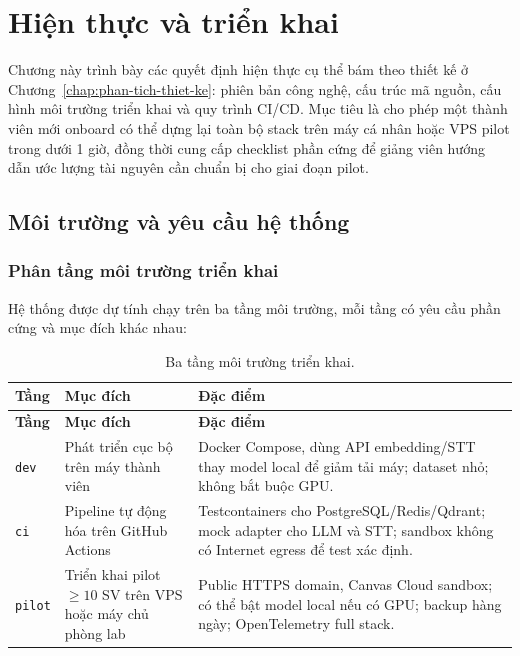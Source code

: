 \chapter{Hiện thực và triển khai}
\label{chap:hien-thuc-trien-khai}

Chương này trình bày các quyết định hiện thực cụ thể bám theo thiết kế
ở Chương~\ref{chap:phan-tich-thiet-ke}: phiên bản công nghệ, cấu trúc
mã nguồn, cấu hình môi trường triển khai và quy trình CI/CD. Mục tiêu
là cho phép một thành viên mới onboard có thể dựng lại toàn bộ stack
trên máy cá nhân hoặc VPS pilot trong dưới 1 giờ, đồng thời cung cấp
checklist phần cứng để giảng viên hướng dẫn ước lượng tài nguyên cần
chuẩn bị cho giai đoạn pilot.

\section{Môi trường và yêu cầu hệ thống}
\label{sec:environment-requirements}

\subsection{Phân tầng môi trường triển khai}

Hệ thống được dự tính chạy trên ba tầng môi trường, mỗi tầng có yêu
cầu phần cứng và mục đích khác nhau:

\begin{longtable}{|p{2cm}|p{3.2cm}|p{8.3cm}|}
\caption{Ba tầng môi trường triển khai.}
\label{tab:envs-c5} \\
\hline
\textbf{Tầng} & \textbf{Mục đích} & \textbf{Đặc điểm} \\
\hline
\endfirsthead
\hline
\textbf{Tầng} & \textbf{Mục đích} & \textbf{Đặc điểm} \\
\hline
\endhead

\texttt{dev}
    & Phát triển cục bộ trên máy thành viên
    & Docker Compose, dùng API embedding/STT thay model local để giảm
      tải máy; dataset nhỏ; không bắt buộc GPU. \\
\hline
\texttt{ci}
    & Pipeline tự động hóa trên GitHub Actions
    & Testcontainers cho PostgreSQL/Redis/Qdrant; mock adapter cho LLM
      và STT; sandbox không có Internet egress để test xác định. \\
\hline
\texttt{pilot}
    & Triển khai pilot $\geq 10$ SV trên VPS hoặc máy chủ phòng lab
    & Public HTTPS domain, Canvas Cloud sandbox; có thể bật model
      local nếu có GPU; backup hàng ngày; OpenTelemetry full stack. \\
\hline
\end{longtable}

